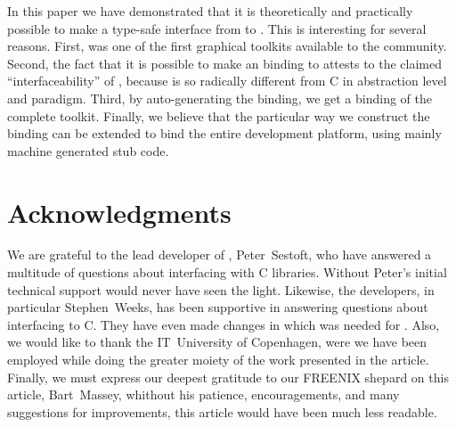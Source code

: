 \documentclass[finalversion]{usetex-v1}
\begin{document}

In this paper we have demonstrated that it is theoretically and
practically possible to make a type-safe interface from \sml to \gtk.
This is interesting for several reasons. First, \mgtk was one of the
first graphical toolkits available to the \sml community. Second, the
fact that it is possible to make an \sml binding to \gtk
attests to the claimed ``interfaceability'' of \gtk, because \sml is so
radically different from C in abstraction level and paradigm. Third,
by auto-generating the binding, we get a binding of the complete \gtk
toolkit. Finally, we believe that the particular way we construct the
binding can be extended to bind the
entire \gnome development platform, using mainly machine generated
stub code.


\section{Acknowledgments}
\label{sec:acknowledgments}

We are grateful to the lead developer of \mosml, Peter~Sestoft, who
have answered a multitude of questions about interfacing \mosml with C
libraries.  Without Peter's initial technical support \mgtk would
never have seen the light.  Likewise, the \mlton developers, in
particular Stephen~Weeks, has been supportive in answering questions
about interfacing \mlton to C.  They have even made changes in \mlton
which was needed for \mgtk.  Also, we would like to thank the
IT~University of Copenhagen, were we have been employed while doing the
greater moiety of the work presented in the article.  Finally, we
must express our deepest gratitude to our FREENIX shepard on this
article, Bart~Massey, whithout his patience, encouragements, and many
suggestions for improvements, this article would have been much less
readable.




\end{document}

